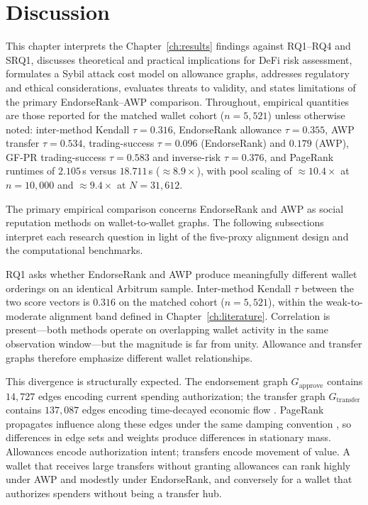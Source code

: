 \chapter{Discussion}
\label{ch:discussion}

This chapter interprets the Chapter~\ref{ch:results} findings against RQ1--RQ4 and SRQ1, discusses theoretical and practical implications for DeFi risk assessment, formulates a Sybil attack cost model on allowance graphs, addresses regulatory and ethical considerations, evaluates threats to validity, and states limitations of the primary EndorseRank--AWP comparison. Throughout, empirical quantities are those reported for the matched wallet cohort ($n=5{,}521$) unless otherwise noted: inter-method Kendall $\tau=0.316$, EndorseRank allowance $\tau=0.355$, AWP transfer $\tau=0.534$, trading-success $\tau=0.096$ (EndorseRank) and $0.179$ (AWP), GF-PR trading-success $\tau=0.583$ and inverse-risk $\tau=0.376$, and PageRank runtimes of $2.105$\,s versus $18.711$\,s ($\approx 8.9\times$), with pool scaling of $\approx 10.4\times$ at $n=10{,}000$ and $\approx 9.4\times$ at $N=31{,}612$.


The primary empirical comparison concerns EndorseRank and AWP as social reputation methods on wallet-to-wallet graphs. The following subsections interpret each research question in light of the five-proxy alignment design and the computational benchmarks.


RQ1 asks whether EndorseRank and AWP produce meaningfully different wallet orderings on an identical Arbitrum sample. Inter-method Kendall $\tau$ between the two score vectors is $0.316$ on the matched cohort ($n=5{,}521$), within the weak-to-moderate alignment band defined in Chapter~\ref{ch:literature}. Correlation is present---both methods operate on overlapping wallet activity in the same observation window---but the magnitude is far from unity. Allowance and transfer graphs therefore emphasize different wallet relationships.

This divergence is structurally expected. The endorsement graph $G_{\text{approve}}$ contains $14{,}727$ edges encoding current spending authorization; the transfer graph $G_{\text{transfer}}$ contains $137{,}087$ edges encoding time-decayed economic flow . PageRank propagates influence along these edges under the same damping convention , so differences in edge sets and weights produce differences in stationary mass. Allowances encode authorization intent; transfers encode movement of value. A wallet that receives large transfers without granting allowances can rank highly under AWP and modestly under EndorseRank, and conversely for a wallet that authorizes spenders without being a transfer hub.

